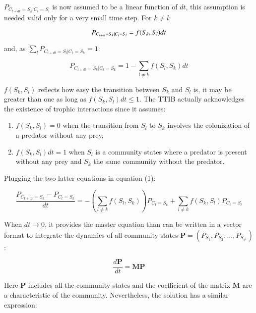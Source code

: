 \(P_{C_{t+dt}=S_k|C_{t}=S_l}\) is now assumed to be a linear function
of \(dt\), this assumption is needed valid only for a very small time
step. For \(k \neq l\):

\begin{equation}
P_{C_{t+dt}=S_k|C_{t}=S_l} = f(S_k,S_l)dt \\
\end{equation}

and, as \(\sum_l P_{C_{t+dt}=S_l|C_{t}=S_k} = 1\):

\begin{equation}
P_{C_{t+dt}=S_k|C_{t}=S_k} = 1-\sum_{l \neq k}f(S_l,S_k)dt
\end{equation}

\(f(S_k,S_l)\) reflects how easy the transition between \(S_k\) and
\(S_l\) is, it may be greater than one as long as
\(f(S_k,S_l)dt\leqslant1\). The TTIB actually acknowledges the existence
of trophic interactions since it assumes:

\begin{enumerate}
\def\labelenumi{\arabic{enumi}.}
\tightlist
\item
  \(f(S_k,S_l)=0\) when the transition from \(S_l\) to \(S_k\) involves
  the colonization of a predator without any prey,
\item
  \(f(S_k,S_l)dt=1\) when \(S_l\) is a community states where a predator
  is present without any prey and \(S_k\) the same community without the
  predator.
\end{enumerate}

Plugging the two latter equations in equation (1):

\begin{equation}
\frac{P_{C_{t+dt}=S_{k}}-P_{C_{t}=S_{k}}}{dt} = -\left(\sum_{l \neq k}f(S_l,S_k)\right)P_{C_{t}=S_{k}} + \sum_{l \neq k}f(S_k,S_l)P_{C_{t}=S_{l}}
\end{equation}

When \(dt \rightarrow 0\), it provides the master equation than can be
written in a vector format to integrate the dynamics of all community
states \(\mathbf{P}=(P_{S_1}, P_{S_2}, ..., P_{S_{2^T}})\):

\begin{equation}
\frac{d\mathbf{P}}{dt} = \mathbf{M}\mathbf{P}
\end{equation}

Here \(\mathbf{P}\) includes all the community states and the coefficient of the matrix
\(\mathbf{M}\) are a characteristic of the community. Nevertheless, the solution has a
similar expression:

